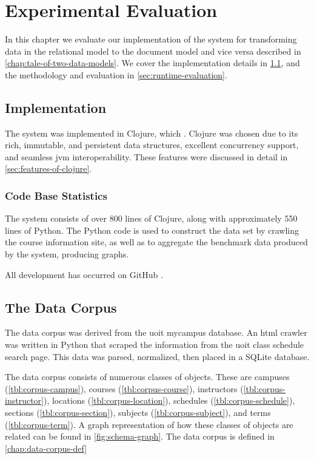 \chapter{Experimental Evaluation}
\label{chap:experimental-evaluation}
	
	In this chapter we evaluate our implementation of the system for transforming data in the relational model to the document model and vice versa described in \cref{chap:tale-of-two-data-models}.  We cover the implementation details in \cref{sec:implementation}, and the methodology and evaluation in \cref{sec:runtime-evaluation}.
	
	\section{Implementation}
	\label{sec:implementation}
		The system was implemented in Clojure, which .  Clojure was chosen due to its rich, immutable, and persistent data structures, excellent concurrency support, and seamless \gls{jvm} interoperability.  These features were discussed in detail in \cref{sec:features-of-clojure}.
		
		\subsection{Code Base Statistics}
			The system consists of over 800 lines of Clojure, along with approximately 550 lines of Python.  The Python code is used to construct the data set by crawling the course information site, as well as to aggregate the benchmark data produced by the system, producing graphs.
			
			All development has occurred on GitHub \cite{molly-repo}. 
	
	\section{The Data Corpus}
	\label{sec:data-corpus}
		The data corpus was derived from the \gls{uoit} mycampus database.  An \gls{html} crawler was written in Python that scraped the information from the \gls{uoit} class schedule search page.  This data was parsed, normalized, then placed in a SQLite database.
		
		The data corpus consists of numerous classes of objects.  These are campuses (\cref{tbl:corpus-campus}), courses (\cref{tbl:corpus-course}), instructors (\cref{tbl:corpus-instructor}), locations (\cref{tbl:corpus-location}), schedules (\cref{tbl:corpus-schedule}), sections (\cref{tbl:corpus-section}), subjects (\cref{tbl:corpus-subject}), and terms (\cref{tbl:corpus-term}).  A graph representation of how these classes of objects are related can be found in \cref{fig:schema-graph}.  The data corpus is defined in \cref{chap:data-corpus-def}
		
